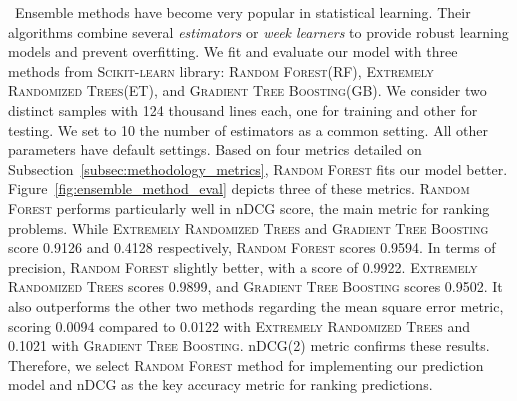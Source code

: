\ Ensemble methods have become very popular in statistical learning. Their algorithms combine several \emph{estimators} or \emph{week learners} to provide robust learning models and prevent overfitting. We fit and evaluate our model with three methods from \textsc{Scikit-learn} library: \textsc{Random Forest}(RF), \textsc{Extremely Randomized Trees}(ET), and \textsc{Gradient Tree Boosting}(GB). We consider two distinct samples with 124 thousand lines each, one for training and other for testing. We set to 10 the number of estimators as a common setting. All other parameters have default settings. Based on four metrics detailed on Subsection~\ref{subsec:methodology_metrics}, \textsc{Random Forest} fits our model better. Figure~\ref{fig:ensemble_method_eval} depicts three of these metrics. \textsc{Random Forest} performs particularly well in nDCG score, the main metric for ranking problems. While \textsc{Extremely Randomized Trees} and \textsc{Gradient Tree Boosting} score 0.9126 and 0.4128 respectively, \textsc{Random Forest} scores 0.9594. In terms of precision, \textsc{Random Forest} slightly better, with a score of 0.9922.  \textsc{Extremely Randomized Trees} scores 0.9899, and \textsc{Gradient Tree Boosting} scores 0.9502.  It also outperforms the other two methods regarding the mean square error metric, scoring 0.0094 compared to 0.0122 with \textsc{Extremely Randomized Trees} and 0.1021 with \textsc{Gradient Tree Boosting}. nDCG(2) metric confirms these results. Therefore, we select \textsc{Random Forest} method for implementing our prediction model and nDCG as the key accuracy metric for ranking predictions. 

